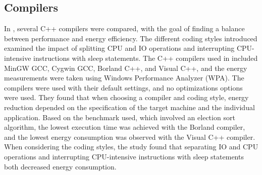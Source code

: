 \subsection{Compilers}
In \cite{hassan2017}, several C++ compilers were compared, with the goal of finding a balance between performance and energy efficiency. The different coding styles introduced examined the impact of splitting CPU and IO operations and interrupting CPU-intensive instructions with sleep statements. The C++ compilers used in \cite{hassan2017} included MinGW GCC, Cygwin GCC, Borland C++, and Visual C++, and the energy measurements were taken using Windows Performance Analyzer (WPA). The compilers were used with their default settings, and no optimizations options were used. %
 They found that when choosing a compiler and coding style, energy reduction depended on the specification of the target machine and the individual application. Based on the benchmark used, which involved an election sort algorithm, the lowest execution time was achieved with the Borland compiler, and the lowest energy consumption was observed with the Visual C++ compiler. When considering the coding styles, the study found that separating IO and CPU operations and interrupting CPU-intensive instructions with sleep statements both decreased energy consumption.